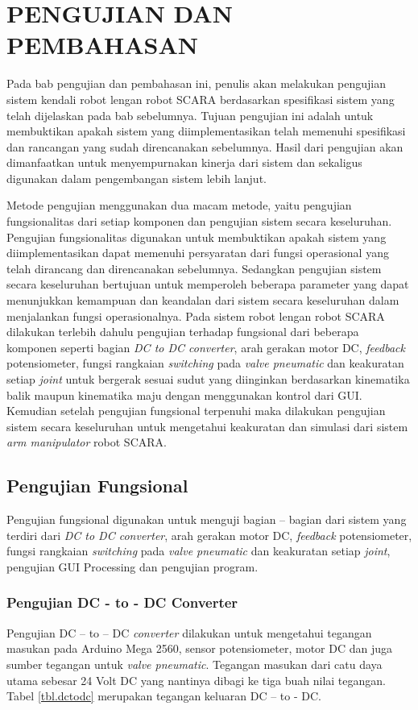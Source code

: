 
\chapter{PENGUJIAN DAN PEMBAHASAN}
Pada bab pengujian dan pembahasan ini, penulis akan melakukan pengujian sistem kendali robot lengan robot SCARA berdasarkan spesifikasi sistem yang telah dijelaskan pada bab sebelumnya. Tujuan pengujian ini adalah untuk membuktikan apakah sistem yang diimplementasikan telah memenuhi spesifikasi dan rancangan yang sudah direncanakan sebelumnya. Hasil dari pengujian akan dimanfaatkan untuk menyempurnakan kinerja dari sistem dan sekaligus digunakan dalam pengembangan sistem lebih lanjut. 

Metode pengujian menggunakan dua macam metode, yaitu pengujian fungsionalitas dari setiap komponen dan pengujian sistem secara keseluruhan. Pengujian fungsionalitas digunakan untuk membuktikan apakah sistem yang diimplementasikan dapat memenuhi persyaratan dari fungsi operasional yang telah dirancang dan direncanakan sebelumnya. Sedangkan pengujian sistem secara keseluruhan bertujuan untuk memperoleh beberapa parameter yang dapat menunjukkan kemampuan dan keandalan dari sistem secara keseluruhan dalam menjalankan fungsi operasionalnya. Pada sistem robot lengan robot SCARA dilakukan terlebih dahulu pengujian terhadap fungsional dari beberapa komponen seperti bagian \textit{DC to DC converter}, arah gerakan motor DC, \textit{feedback} potensiometer, fungsi rangkaian \textit{switching} pada \textit{valve pneumatic} dan keakuratan setiap \textit{joint} untuk bergerak sesuai sudut yang diinginkan berdasarkan kinematika balik maupun kinematika maju dengan menggunakan kontrol dari GUI.  Kemudian setelah pengujian fungsional terpenuhi maka dilakukan pengujian sistem secara keseluruhan untuk mengetahui keakuratan dan simulasi dari sistem \textit{arm manipulator} robot SCARA.

\section{Pengujian Fungsional}
Pengujian fungsional digunakan untuk menguji bagian – bagian dari sistem yang terdiri dari \textit{DC to DC converter}, arah gerakan motor DC, \textit{feedback} potensiometer, fungsi rangkaian \textit{switching} pada \textit{valve pneumatic} dan keakuratan setiap \textit{joint}, pengujian GUI Processing dan pengujian program. 

\subsection{Pengujian DC - to - DC Converter}
Pengujian DC – to – DC \textit{converter} dilakukan untuk mengetahui tegangan masukan pada Arduino Mega 2560, sensor potensiometer, motor DC dan juga sumber tegangan untuk\textit{ valve pneumatic}. Tegangan masukan dari catu daya utama sebesar 24 Volt DC yang nantinya dibagi ke tiga buah nilai tegangan. Tabel \ref{tbl.dctodc} merupakan tegangan keluaran DC – to - DC.

